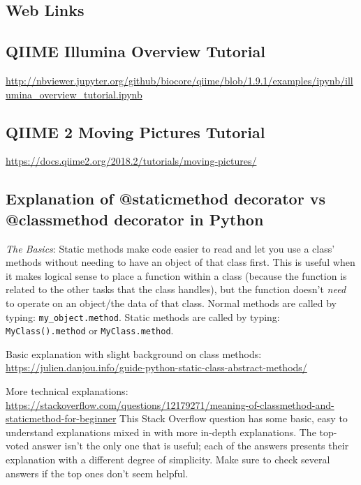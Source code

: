 %
\begin{fullpage}

    \appendix
    \chapter{Web Links}
    
    \section{QIIME Illumina Overview Tutorial}
    \label{appendix:IlluminaOverTut}
    \url{http://nbviewer.jupyter.org/github/biocore/qiime/blob/1.9.1/examples/ipynb/illumina_overview_tutorial.ipynb}
    
    \section{QIIME 2 Moving Pictures Tutorial}
    \label{appendix:MovingPicTut}
    \url{https://docs.qiime2.org/2018.2/tutorials/moving-pictures/}


    \section{Explanation of @staticmethod decorator vs @classmethod decorator in Python}
    \label{app:static-method}
    \textit{The Basics}: Static methods make code easier to read and let you use a class' methods without needing to have an object of that class first. This is useful when it makes logical sense to place a function within a class (because the function is related to the other tasks that the class handles), but the function doesn't \textit{need} to operate on an object/the data of that class. Normal methods are called by typing: \verb|my_object.method|. Static methods are called by typing: \verb|MyClass().method| or \verb|MyClass.method|.
    
    Basic explanation with slight background on class methods: 
    \newline
    \url{https://julien.danjou.info/guide-python-static-class-abstract-methods/}

    More technical explanations: 
    \newline
    \url{https://stackoverflow.com/questions/12179271/meaning-of-classmethod-and-staticmethod-for-beginner}
    This Stack Overflow question has some basic, easy to understand explanations mixed in with more in-depth explanations. The top-voted answer isn't the only one that is useful; each of the answers presents their explanation with a different degree of simplicity. Make sure to check several answers if the top ones don't seem helpful. 
    

\end{fullpage}

